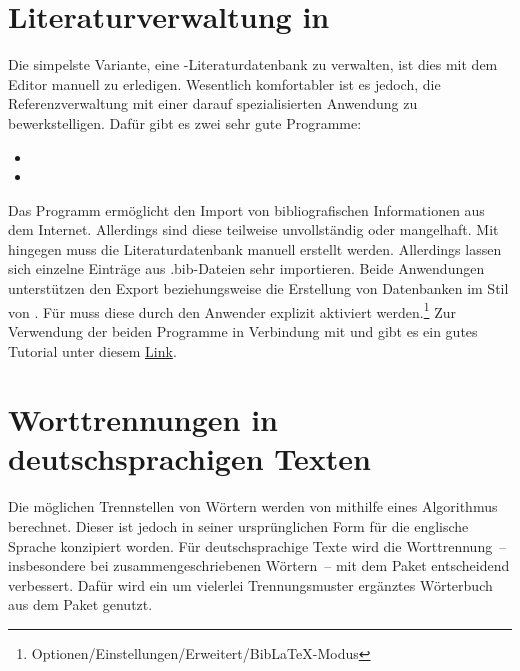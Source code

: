 \section{Literaturverwaltung in }
%
Die simpelste Variante, eine -Literaturdatenbank zu verwalten, 
ist dies mit dem Editor manuell zu erledigen. Wesentlich komfortabler ist es 
jedoch, die Referenzverwaltung mit einer darauf spezialisierten Anwendung zu 
bewerkstelligen. Dafür gibt es zwei sehr gute Programme:
%
\begin{itemize}
\item {}
\item {}
\end{itemize}
%
Das Programm  ermöglicht den Import von bibliografischen 
Informationen aus dem Internet. Allerdings sind diese teilweise unvollständig 
oder mangelhaft. Mit  hingegen muss die Literaturdatenbank 
manuell erstellt werden. Allerdings lassen sich einzelne Einträge aus 
.bib-Dateien sehr importieren. Beide Anwendungen unterstützen den Export 
beziehungsweise die Erstellung von Datenbanken im Stil von . 
Für  muss diese durch den Anwender explizit aktiviert 
werden.\footnote{Optionen/Einstellungen/Erweitert/BibLaTeX-Modus} 
Zur Verwendung der beiden Programme in Verbindung mit  und 
 gibt es ein gutes Tutorial unter diesem
\href{http://www.suedraum.de/latex/stammtisch/degenkolb_latex_biblatex_folien-final.pdf}{Link}.



\section{Worttrennungen in deutschsprachigen Texten}
%
Die möglichen Trennstellen von Wörtern werden von  mithilfe 
eines Algorithmus berechnet. Dieser ist jedoch in seiner ursprünglichen Form 
für die englische Sprache konzipiert worden. Für deutschsprachige Texte wird 
die Worttrennung~-- insbesondere bei zusammengeschriebenen Wörtern~-- mit dem 
Paket  entscheidend verbessert. Dafür wird ein um vielerlei 
Trennungsmuster ergänztes Wörterbuch aus dem Paket  
genutzt. 

